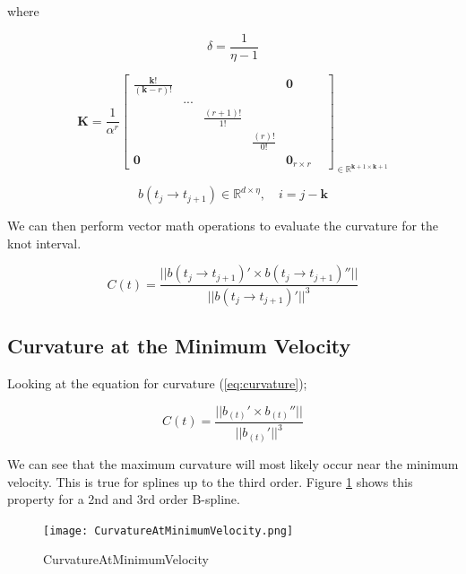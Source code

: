 \documentclass{article}
\begin{document}
where

\begin{equation}
    \delta = \frac{1}{\eta-1}
\end{equation}

\begin{equation}
    \textbf{K} = \frac{1}{\alpha^r}\begin{bmatrix} \frac{\textbf{k}!}{(\textbf{k}-r)!} & & & &  \textbf{0}\\ 
    & ... & & & & 
    \\ 
    & &  \frac{(r+1)!}{1!} & &
    \\  & & & \frac{(r)!}{0!} &
    \\ \textbf{0} &  & & & \textbf{0}_{r \times r} \end{bmatrix}_{\in \mathbb{R}^{\textbf{k}+1 \times \textbf{k}+1}}
\end{equation}

\begin{equation}
    b(t_j \rightarrow t_{j+1}) \in \mathbb{R}^{d \times \eta}, \quad i = j-\textbf{k}
\end{equation}

We can then perform vector math operations to evaluate the curvature for the knot interval.

\begin{equation}
    C(t) = \frac{||b(t_j \rightarrow t_{j+1})' \times b(t_j \rightarrow t_{j+1})''||}{||b(t_j \rightarrow t_{j+1})'||^3}
\end{equation}

\subsection{Curvature at the Minimum Velocity} \label{Curvature at Min Velocity}

Looking at the equation for curvature (\ref{eq:curvature});

\begin{equation}
    C(t) = \frac{||b_{(t)}' \times b_{(t)}''||}{||b_{(t)}'||^3}
\end{equation}

We can see that the maximum curvature will most likely occur near the minimum velocity. This is true for splines up to the third order. Figure \ref{Time at minimum velocity and maximum curvature} shows this property for a 2nd and 3rd order B-spline. 

\begin{figure}[H]
\centering
\texttt{[image: CurvatureAtMinimumVelocity.png]}
\caption{CurvatureAtMinimumVelocity}
\label{Time at minimum velocity and maximum curvature}
\end{figure}
\end{document}
